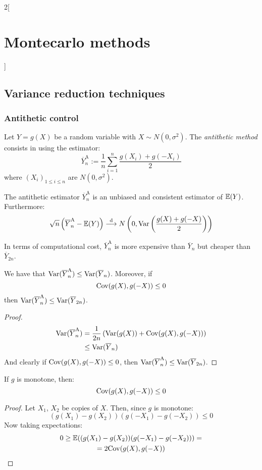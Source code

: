 \documentclass[../../../main_math.tex]{subfiles}
\begin{document}
\begin{multicols}{2}[\section{Montecarlo methods}]
  \subsection{Variance reduction techniques}
  \subsubsection{Antithetic control}
  \begin{definition}
    Let $Y=g(X)$ be a random variable with $X\sim N(0,\sigma^2)$. The \emph{antithetic method} consists in using the estimator:
    $$
      \overline{Y}_n^{\text{A}}:=\frac{1}{n} \sum_{i=1}^n \frac{g(X_i)+g(-X_i)}{2}
    $$
    where ${(X_i)}_{1\leq i\leq n}$ are \iid $N(0,\sigma^2)$.
  \end{definition}
  \begin{lemma}
    The antithetic estimator $\overline{Y}_n^{\text{A}}$ is an unbiased and consistent estimator of $\mathbb{E}(Y)$. Furthermore:
    $$
      \sqrt{n}\left(\overline{Y}_n^{\text{A}}-\mathbb{E}(Y)\right)\overset{\text{d}}{\longrightarrow}N\left(0,\mathrm{Var}\left(\frac{g(X)+g(-X)}{2}\right)\right)
    $$
  \end{lemma}
  \begin{remark}
    In terms of computational cost, $\overline{Y}_n^{\text{A}}$ is more expensive than $\overline{Y}_n$ but cheaper than $\overline{Y}_{2n}$.
  \end{remark}
  \begin{proposition}
    We have that $\mathrm{Var}(\overline{Y}_n^{\text{A}})\leq \mathrm{Var}(\overline{Y}_n)$. Moreover, if
    $$
      \mathrm{Cov}(g(X),g(-X))\leq 0
    $$
    then $\mathrm{Var}(\overline{Y}_n^{\text{A}})\leq \mathrm{Var}(\overline{Y}_{2n})$.
  \end{proposition}
  \begin{proof}
    \begin{align*}
      \mathrm{Var}(\overline{Y}_n^{\text{A}}) & =\frac{1}{2n}\left(\mathrm{Var}(g(X))+\mathrm{Cov}(g(X),g(-X))\right) \\
                                      & \leq \mathrm{Var}(\overline{Y}_n)
    \end{align*}
    And clearly if $\mathrm{Cov}(g(X),g(-X))\leq 0$, then $\mathrm{Var}(\overline{Y}_n^{\text{A}})\leq \mathrm{Var}(\overline{Y}_{2n})$.
  \end{proof}
  \begin{proposition}
    If $g$ is monotone, then:
    $$
      \mathrm{Cov}(g(X),g(-X))\leq 0
    $$
  \end{proposition}
  \begin{proof}
    Let $X_1$, $X_2$ be \iid copies of $X$. Then, since $g$ is monotone:
    $$
      (g(X_1)-g(X_2))(g(-X_1)-g(-X_2))\leq 0
    $$
    Now taking expectations:
    \begin{multline*}
      0\geq\mathbb{E}((g(X_1)-g(X_2))(g(-X_1)-g(-X_2)))=\\=2 \mathrm{Cov}(g(X),g(-X))
    \end{multline*}
  \end{proof}

\end{multicols}
\end{document}
